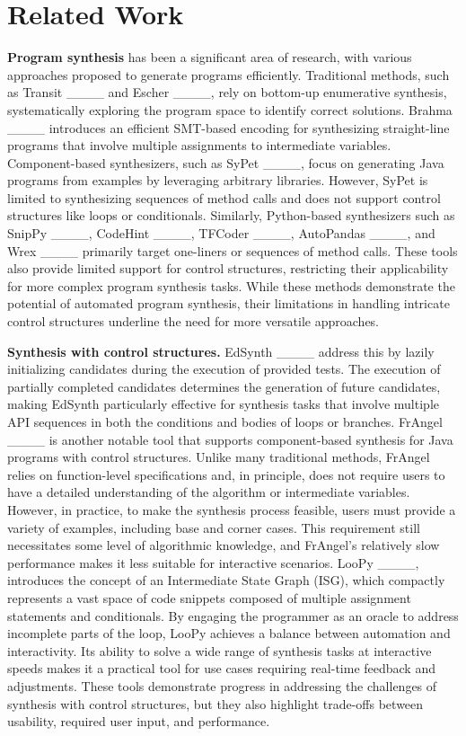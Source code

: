 \section{Related Work}
\textbf{Program synthesis} has been a significant area of research, with various approaches proposed to generate programs efficiently. Traditional methods, such as Transit ____ and Escher ____, rely on bottom-up enumerative synthesis, systematically exploring the program space to identify correct solutions. Brahma ____ introduces an efficient SMT-based encoding for synthesizing straight-line programs that involve multiple assignments to intermediate variables. Component-based synthesizers, such as SyPet ____, focus on generating Java programs from examples by leveraging arbitrary libraries. However, SyPet is limited to synthesizing sequences of method calls and does not support control structures like loops or conditionals. Similarly, Python-based synthesizers such as SnipPy ____, CodeHint ____, TFCoder ____, AutoPandas ____, and Wrex ____ primarily target one-liners or sequences of method calls. These tools also provide limited support for control structures, restricting their applicability for more complex program synthesis tasks. While these methods demonstrate the potential of automated program synthesis, their limitations in handling intricate control structures underline the need for more versatile approaches.

\textbf{Synthesis with control structures.} EdSynth ____ address this by lazily initializing candidates during the execution of provided tests. The execution of partially completed candidates determines the generation of future candidates, making EdSynth particularly effective for synthesis tasks that involve multiple API sequences in both the conditions and bodies of loops or branches.
FrAngel ____ is another notable tool that supports component-based synthesis for Java programs with control structures. Unlike many traditional methods, FrAngel relies on function-level specifications and, in principle, does not require users to have a detailed understanding of the algorithm or intermediate variables. However, in practice, to make the synthesis process feasible, users must provide a variety of examples, including base and corner cases. This requirement still necessitates some level of algorithmic knowledge, and FrAngel’s relatively slow performance makes it less suitable for interactive scenarios.
LooPy ____, introduces the concept of an Intermediate State Graph (ISG), which compactly represents a vast space of code snippets composed of multiple assignment statements and conditionals. By engaging the programmer as an oracle to address incomplete parts of the loop, LooPy achieves a balance between automation and interactivity. Its ability to solve a wide range of synthesis tasks at interactive speeds makes it a practical tool for use cases requiring real-time feedback and adjustments.
These tools demonstrate progress in addressing the challenges of synthesis with control structures, but they also highlight trade-offs between usability, required user input, and performance.

